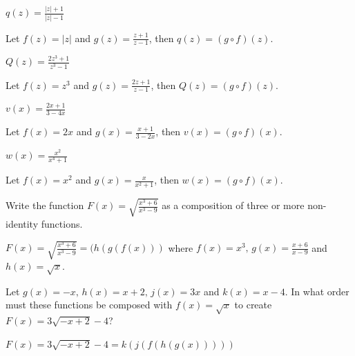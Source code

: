 \documentclass{ximera}
\begin{document}
\begin{question}
\begin{problem}
$q(z) = \frac{|z|+1}{|z|-1}$

\begin{solution}
     Let $f(z) = |z|$ and $g(z) = \frac{z+1}{z-1}$, then  $q(z) =(g\circ f)(z)$.
\end{solution}
\end{problem} 

\begin{problem}
$Q(z) = \frac{2z^3+1}{z^3-1}$

\begin{solution}
    Let $f(z) = z^3$ and $g(z)= \frac{2z+1}{z-1}$, then  $Q(z) =(g\circ f)(z)$.
\end{solution}
\end{problem} 

\begin{problem}
$v(x) = \frac{2x+1}{3-4x}$

\begin{solution}
    Let $f(x) =2x$ and $g(x) = \frac{x+1}{3-2x}$, then  $v(x) =(g\circ f)(x)$.
\end{solution}
\end{problem} 

\begin{problem}\label{breakdownxomexlast}
$w(x) = \frac{x^2}{x^4+1}$ 

\begin{solution}
    Let $f(x) = x^2$ and $g(x) = \frac{x}{x^2+1}$, then  $w(x) =(g\circ f)(x)$.
\end{solution}
\end{problem}  

\end{question}

\begin{problem}
Write the function $F(x) = \sqrt{\frac{x^{3} + 6}{x^{3} - 9}}$ as a composition of three or more non-identity functions.

\begin{solution}
    $F(x) = \sqrt{\frac{x^{3} + 6}{x^{3} - 9}} = (h(g(f(x)))$ where $f(x) = x^{3}, \, g(x) = \frac{x + 6}{x - 9}$ and $h(x) = \sqrt{x}$.
\end{solution}
\end{problem}

\begin{problem}
Let $g(x) = -x, \, h(x) = x + 2, \, j(x) = 3x$ and $k(x) = x - 4$.  In what order must these functions be composed with $f(x) = \sqrt{x}$ to create $F(x) = 3\sqrt{-x + 2} - 4$?

\begin{solution}
    $F(x) = 3\sqrt{-x + 2} - 4 = k(j(f(h(g(x)))))$
\end{solution}
\end{problem}
\end{document}
